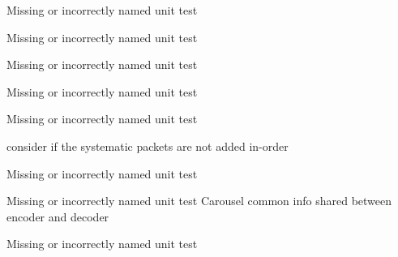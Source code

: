 
\begin{DoxyRefList}
\item[\label{todo__todo000001}%
\hypertarget{todo__todo000001}{}%
Class \hyperlink{classkodo_1_1aligned__coefficients__buffer}{kodo\-:\-:aligned\-\_\-coefficients\-\_\-buffer$<$ Super\-Coder $>$} ]Missing or incorrectly named unit test  
\item[\label{todo__todo000002}%
\hypertarget{todo__todo000002}{}%
Class \hyperlink{classkodo_1_1aligned__coefficients__decoder}{kodo\-:\-:aligned\-\_\-coefficients\-\_\-decoder$<$ Super\-Coder $>$} ]Missing or incorrectly named unit test


\item[\label{todo__todo000036}%
\hypertarget{todo__todo000036}{}%
Class \hyperlink{classkodo_1_1base__plain__symbol__id__reader}{kodo\-:\-:base\-\_\-plain\-\_\-symbol\-\_\-id\-\_\-reader$<$ Super\-Coder $>$} ]Missing or incorrectly named unit test


\item[\label{todo__todo000037}%
\hypertarget{todo__todo000037}{}%
Class \hyperlink{classkodo_1_1base__plain__symbol__id__writer}{kodo\-:\-:base\-\_\-plain\-\_\-symbol\-\_\-id\-\_\-writer$<$ Super\-Coder $>$} ]Missing or incorrectly named unit test


\item[\label{todo__todo000066}%
\hypertarget{todo__todo000066}{}%
Class \hyperlink{classkodo_1_1base__systematic__encoder}{kodo\-:\-:base\-\_\-systematic\-\_\-encoder$<$ Systematic\-On, Super\-Coder $>$} ]Missing or incorrectly named unit test


\item[\label{todo__todo000067}%
\hypertarget{todo__todo000067}{}%
Member \hyperlink{classkodo_1_1base__systematic__encoder_ad17e2fa5ddc45e7678d0fad11ab75a0e}{kodo\-:\-:base\-\_\-systematic\-\_\-encoder$<$ Systematic\-On, Super\-Coder $>$\-:\-:encode\-\_\-systematic} (uint8\-\_\-t $\ast$symbol\-\_\-data, uint8\-\_\-t $\ast$symbol\-\_\-header)]consider if the systematic packets are not added in-\/order  
\item[\label{todo__todo000003}%
\hypertarget{todo__todo000003}{}%
Class \hyperlink{classkodo_1_1bidirectional__linear__block__decoder}{kodo\-:\-:bidirectional\-\_\-linear\-\_\-block\-\_\-decoder$<$ Direction\-Policy, Super\-Coder $>$} ]Missing or incorrectly named unit test


\item[\label{todo__todo000024}%
\hypertarget{todo__todo000024}{}%
Class \hyperlink{classkodo_1_1carousel__common}{kodo\-:\-:carousel\-\_\-common} ]Missing or incorrectly named unit test Carousel common info shared between encoder and decoder  
\item[\label{todo__todo000025}%
\hypertarget{todo__todo000025}{}%
Class \hyperlink{classkodo_1_1carousel__decoder}{kodo\-:\-:carousel\-\_\-decoder$<$ Super\-Coder $>$} ]Missing or incorrectly named unit test



\end{DoxyRefList}
